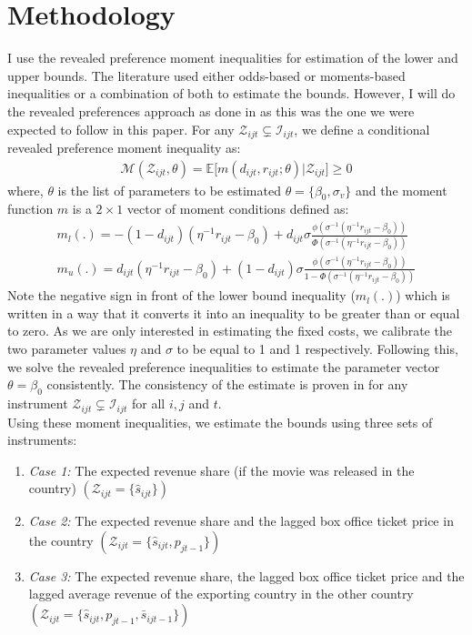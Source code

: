 \documentclass[11pt, letterpaper]{article} \usepackage{amsmath}
\begin{document}
\section{Methodology}
I use the revealed preference moment inequalities for estimation of
the lower and upper bounds. The literature used either odds-based or
moments-based inequalities or a combination of both to estimate the
bounds. However, I will do the revealed preferences approach as done
in \citep{pakes2015} as this was the one we were expected to follow in
this paper. For any $\mathcal{Z}_{ijt} \subsetneq \mathcal{I}_{ijt}$,
we define a conditional revealed preference moment inequality as:
\begin{align*}
  \mathcal{M}(\mathcal{Z}_{ijt}, \theta) = \mathbb{E}\bigg[ m(d_{ijt},
  r_{ijt}; \theta) \bigg| \mathcal{Z}_{ijt} \bigg] \geq 0
\end{align*}
where, $\theta$ is the list of parameters to be estimated
$\theta = \{\beta_0, \sigma_{v}\}$ and the moment function $m$ is a
$2 \times 1$ vector of moment conditions defined as:
\begin{align*}
  m_l(.) = -(1-d_{ijt})(\eta^{-1}r_{ijt} - \beta_0) + d_{ijt} \sigma
  \frac{\phi(\sigma^{-1}(\eta^{-1}r_{ijt} -
  \beta_0))}{\Phi(\sigma^{-1}(\eta^{-1}r_{ijt} -\beta_0))}\\
  m_u(.) = d_{ijt}(\eta^{-1}r_{ijt} - \beta_0) + (1-d_{ijt}) \sigma
  \frac{\phi(\sigma^{-1}(\eta^{-1}r_{ijt} -
  \beta_0))}{1-\Phi(\sigma^{-1}(\eta^{-1}r_{ijt} -\beta_0))}
\end{align*}
Note the negative sign in front of the lower bound inequality
($m_l(.)$) which is written in a way that it converts it into an
inequality to be greater than or equal to zero. As we are only
interested in estimating the fixed costs, we calibrate the two
parameter values $\eta$ and $\sigma$ to be equal to 1 and 1
respectively. Following this, we solve the revealed preference
inequalities to estimate the parameter vector $\theta = \beta_0$
consistently. The consistency of the estimate is proven in
\citet{dickstein2018} for any instrument
$\mathcal{Z}_{ijt} \subsetneq \mathcal{I}_{ijt}$ for all $i,j$ and
$t$.\\
Using these moment inequalities, we estimate the bounds using three
sets of instruments:
\begin{enumerate}
\item \textit{Case 1:} The expected revenue share (if the movie was
  released in the country) $(\mathcal{Z}_{ijt} = \{\hat s_{ijt}\})$
\item \textit{Case 2:} The expected revenue share and the lagged box
  office ticket price in the country
  $(\mathcal{Z}_{ijt} = \{ \hat s_{ijt}, p_{jt-1}\})$
\item \textit{Case 3:} The expected revenue share, the lagged box
  office ticket price and the lagged average revenue of the exporting
  country in the other country
  $(\mathcal{Z}_{ijt} = \{\hat s_{ijt}, p_{jt-1}, \bar s_{ijt-1}\})$
\end{enumerate}
\end{document}
